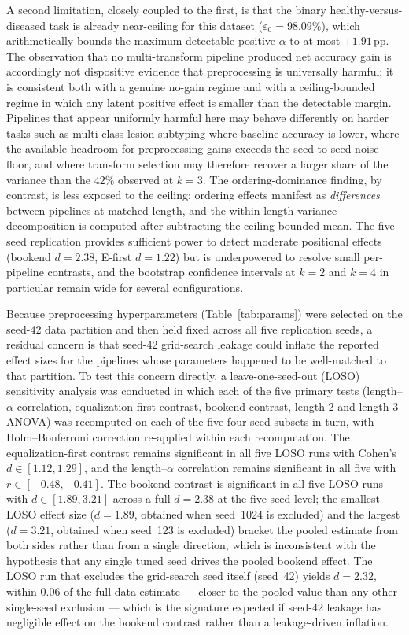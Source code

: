 \documentclass[preprint,5p,times,twocolumn]{elsarticle}
\begin{document}
A second limitation, closely coupled to the first, is that the binary healthy-versus-diseased task is already near-ceiling for this dataset ($\varepsilon_0 = 98.09\%$), which arithmetically bounds the maximum detectable positive $\alpha$ to at most $+1.91$\,pp. The observation that no multi-transform pipeline produced net accuracy gain is accordingly not dispositive evidence that preprocessing is universally harmful; it is consistent both with a genuine no-gain regime and with a ceiling-bounded regime in which any latent positive effect is smaller than the detectable margin. Pipelines that appear uniformly harmful here may behave differently on harder tasks such as multi-class lesion subtyping where baseline accuracy is lower, where the available headroom for preprocessing gains exceeds the seed-to-seed noise floor, and where transform selection may therefore recover a larger share of the variance than the $42\%$ observed at $k=3$. The ordering-dominance finding, by contrast, is less exposed to the ceiling: ordering effects manifest as \emph{differences} between pipelines at matched length, and the within-length variance decomposition is computed after subtracting the ceiling-bounded mean. The five-seed replication provides sufficient power to detect moderate positional effects (bookend $d = 2.38$, E-first $d = 1.22$) but is underpowered to resolve small per-pipeline contrasts, and the bootstrap confidence intervals at $k=2$ and $k=4$ in particular remain wide for several configurations.

Because preprocessing hyperparameters (Table~\ref{tab:params}) were selected on the seed-42 data partition and then held fixed across all five replication seeds, a residual concern is that seed-42 grid-search leakage could inflate the reported effect sizes for the pipelines whose parameters happened to be well-matched to that partition. To test this concern directly, a leave-one-seed-out (LOSO) sensitivity analysis was conducted in which each of the five primary tests (length--$\alpha$ correlation, equalization-first contrast, bookend contrast, length-2 and length-3 ANOVA) was recomputed on each of the five four-seed subsets in turn, with Holm--Bonferroni correction re-applied within each recomputation. The equalization-first contrast remains significant in all five LOSO runs with Cohen's $d \in [1.12, 1.29]$, and the length--$\alpha$ correlation remains significant in all five with $r \in [-0.48, -0.41]$. The bookend contrast is significant in all five LOSO runs with $d \in [1.89, 3.21]$ across a full $d = 2.38$ at the five-seed level; the smallest LOSO effect size ($d = 1.89$, obtained when seed~1024 is excluded) and the largest ($d = 3.21$, obtained when seed~123 is excluded) bracket the pooled estimate from both sides rather than from a single direction, which is inconsistent with the hypothesis that any single tuned seed drives the pooled bookend effect. The LOSO run that excludes the grid-search seed itself (seed~42) yields $d = 2.32$, within $0.06$ of the full-data estimate --- closer to the pooled value than any other single-seed exclusion --- which is the signature expected if seed-42 leakage has negligible effect on the bookend contrast rather than a leakage-driven inflation.
\end{document}
